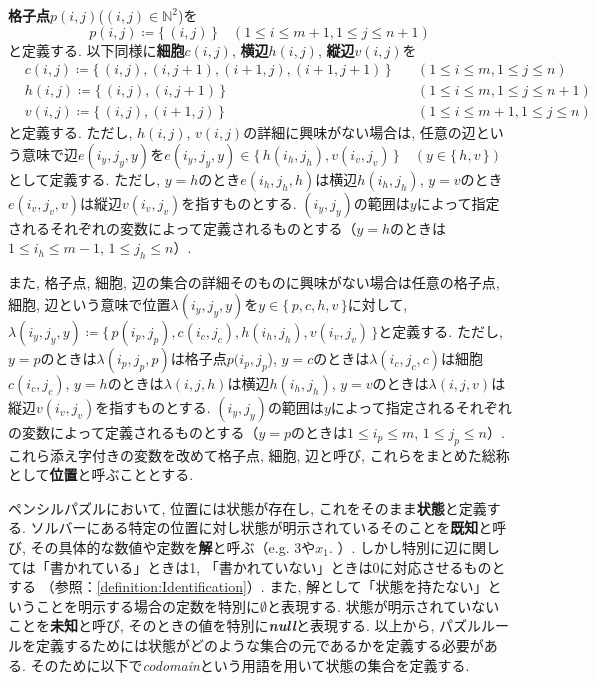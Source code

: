 \begin{definition}[格子点$p(i,j)$, 細胞$c(i,j)$, 横辺$h(i,j)$, 縦辺$v(i,j)$, 位置]\label{definition:VariableAtBoard}
  \textbf{格子点}$p(i,j)$($(i,j)\in \mathbb{N}^2$)を
  \begin{equation}
    p(i,j)\coloneqq \{\,(i,j)\,\} \quad (1\le i \le m+1, 1\le j \le n+1)
  \end{equation}
  と定義する. 以下同様に\textbf{細胞}$c(i,j)$, \textbf{横辺}$h(i,j)$, \textbf{縦辺}$v(i,j)$を
  \begin{align}
     & c(i,j)\coloneqq  \{\,(i,j), (i,j+1), (i+1,j), (i+1,j+1)\,\}  \quad & (1\le i \le m, 1\le j \le n)   \\
     & h(i,j)\coloneqq  \{\,(i,j), (i,j+1)\,\}                      \quad & (1\le i \le m, 1\le j \le n+1) \\
     & v(i,j)\coloneqq  \{\,(i,j), (i+1,j)\,\}                      \quad & (1\le i \le m+1, 1\le j \le n)
  \end{align}
  と定義する. ただし, $h(i,j)$, $v(i,j)$の詳細に興味がない場合は, 任意の辺という意味で辺$e(i_y,j_y,y)$を$e(i_y,j_y,y) \in \{\,h(i_h,j_h), v(i_v,j_v)\,\} \quad (y \in \{\,h,v\,\})$として定義する. ただし, $y=h$のとき$e(i_h,j_h,h)$は横辺$h(i_h,j_h)$, $y=v$のとき$e(i_v,j_v,v)$は縦辺$v(i_v,j_v)$を指すものとする. $(i_y,j_y)$の範囲は$y$によって指定されるそれぞれの変数によって定義されるものとする（$y=h$のときは$1\le i_h \le m-1$, $1\le j_h \le n$）.

  また, 格子点, 細胞, 辺の集合の詳細そのものに興味がない場合は任意の格子点, 細胞, 辺という意味で位置$\lambda(i_y,j_y,y)$を$y \in \{\,p,c,h,v\,\}$に対して, $\lambda(i_y,j_y,y) \coloneqq \{\,p(i_p,j_p),c(i_c,j_c),h(i_h,j_h),v(i_v,j_v)\,\}$と定義する. ただし, $y=p$のときは$\lambda(i_p,j_p,p)$は格子点$p(i_p,j_p$), $y=c$のときは$\lambda(i_c,j_c,c)$は細胞$c(i_c,j_c)$, $y=h$のときは$\lambda(i,j,h)$は横辺$h(i_h,j_h)$, $y=v$のときは$\lambda(i,j,v)$は縦辺$v(i_v,j_v)$を指すものとする. $(i_y,j_y)$の範囲は$y$によって指定されるそれぞれの変数によって定義されるものとする（$y=p$のときは$1\le i_p \le m$, $1\le j_p \le n$）.
  これら添え字付きの変数を改めて格子点, 細胞, 辺と呼び, これらをまとめた総称として\textbf{位置}と呼ぶこととする.
\end{definition}
ペンシルパズルにおいて, 位置には状態が存在し, これをそのまま\textbf{状態}と定義する. ソルバーにある特定の位置に対し状態が明示されているそのことを\textbf{既知}と呼び, その具体的な数値や定数を\textbf{解}と呼ぶ（e.g. 3や$x_1$. ）. しかし特別に辺に関しては「書かれている」ときは1, 「書かれていない」ときは0に対応させるものとする （参照：\cref{definition:Identification}）. また, 解として「状態を持たない」ということを明示する場合の定数を特別に$\emptyset$と表現する. 状態が明示されていないことを\textbf{未知}と呼び, そのときの値を特別に\textbf{\textit{null}}と表現する.
以上から, パズルルールを定義するためには状態がどのような集合の元であるかを定義する必要がある. そのために以下で\textit{codomain}という用語を用いて状態の集合を定義する.

